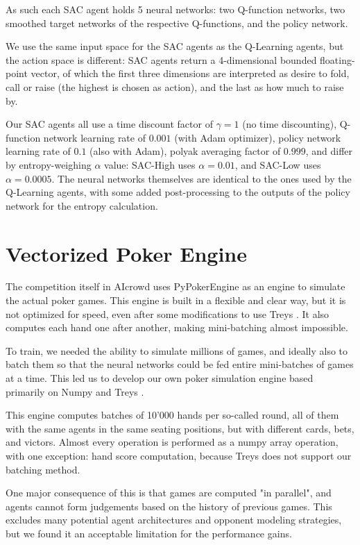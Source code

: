 As such each SAC agent holds 5 neural networks: two Q-function networks, two smoothed target networks of the respective Q-functions, and the policy network.

We use the same input space for the SAC agents as the Q-Learning agents, but the action space is different: SAC agents return a 4-dimensional bounded floating-point vector, of which the first three dimensions are interpreted as desire to fold, call or raise (the highest is chosen as action), and the last as how much to raise by.

Our SAC agents all use a time discount factor of $\gamma = 1$ (no time discounting), Q-function network learning rate of $0.001$ (with Adam optimizer), policy network learning rate of $0.1$ (also with Adam), polyak averaging factor of $0.999$, and differ by entropy-weighing $\alpha$ value: SAC-High uses $\alpha = 0.01$, and SAC-Low uses $\alpha = 0.0005$. The neural networks themselves are identical to the ones used by the Q-Learning agents, with some added post-processing to the outputs of the policy network for the entropy calculation.

\section{Vectorized Poker Engine}
The competition itself in AIcrowd uses PyPokerEngine \cite{Pypokerengine} as an engine to simulate the actual poker games. This engine is built in a flexible and clear way, but it is not optimized for speed, even after some modifications to use Treys \cite{Treys}. It also computes each hand one after another, making mini-batching almost impossible.

To train, we needed the ability to simulate millions of games, and ideally also to batch them so that the neural networks could be fed entire mini-batches of games at a time. This led us to develop our own poker simulation engine based primarily on Numpy \cite{Numpy} and Treys \cite{Treys}.

This engine computes batches of 10'000 hands per so-called round, all of them with the same agents in the same seating positions, but with different cards, bets, and victors. Almost every operation is performed as a numpy array operation, with one exception: hand score computation, because Treys does not support our batching method.

One major consequence of this is that games are computed "in parallel", and agents cannot form judgements based on the history of previous games. This excludes many potential agent architectures and opponent modeling strategies, but we found it an acceptable limitation for the performance gains.

